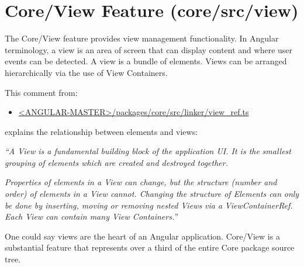 \section{Core/View Feature (core/src/view)}

The Core/View feature provides view management functionality. In Angular
terminology, a view is an area of screen that can display content and where user
events can be detected. A view is a bundle of elements. Views can be arranged
hierarchically via the use of View Containers.

This comment from:

\begin{itemize}
  \item \href{https://github.com/angular/angular/blob/master/packages/core/src/linker/view_ref.ts}
        {<ANGULAR-MASTER>/packages/core/src/linker/view\_ref.ts}
\end{itemize}

explains the relationship between elements and views:

\emph{“A View is a fundamental building block of the application UI. It is the}
\emph{smallest grouping of elements which are created and destroyed together.}

\emph{Properties of elements in a View can change, but the structure (number and}
\emph{order) of elements in a View cannot. Changing the structure of Elements can}
\emph{only be done by inserting, moving or removing nested Views via a}
\emph{ViewContainerRef. Each View can contain many View Containers.”}

One could say views are the heart of an Angular application. Core/View is a
substantial feature that represents over a third of the entire Core package source
tree.



